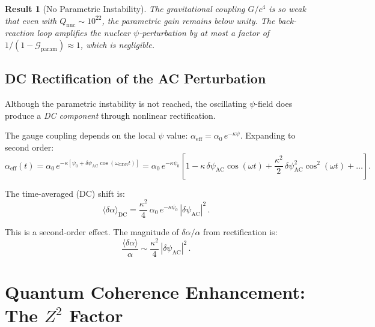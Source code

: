 \documentclass[aps,prd,twocolumn,superscriptaddress,nofootinbib]{revtex4-2}
\newcommand{\kap}{\kappa}
\newcommand{\aeff}{\alpha_{\mathrm{eff}}}
\newcommand{\dalpha}{\delta\alpha}
\newcommand{\Qnuc}{Q_{\mathrm{nuc}}}
\newcommand{\wGDR}{\omega_{\mathrm{GDR}}}
\newtheorem{result}{Result}
\begin{document}
\begin{result}[No Parametric Instability]
The gravitational coupling $G/c^4$ is so weak that even with
$\Qnuc \sim 10^{22}$, the parametric gain remains below unity.
The back-reaction loop amplifies the nuclear $\psi$-perturbation
by at most a factor of $1/(1 - \mathcal{G}_{\mathrm{param}}) \approx
1$, which is negligible.
\end{result}

\subsection{DC Rectification of the AC Perturbation}
\label{sec:rectification}

Although the parametric instability is not reached, the oscillating
$\psi$-field does produce a \emph{DC component} through nonlinear
rectification.

The gauge coupling depends on the local $\psi$ value:
$\aeff = \alpha_0\,e^{-\kap\psi}$.  Expanding to second order:
\begin{equation}
\aeff(t) = \alpha_0\,e^{-\kap[\psi_0 + \delta\psi_{\mathrm{AC}}
\cos(\wGDR t)]}
= \alpha_0\,e^{-\kap\psi_0}\left[1 - \kap\,\delta\psi_{\mathrm{AC}}
\cos(\omega t) + \frac{\kap^2}{2}\,\delta\psi_{\mathrm{AC}}^2
\cos^2(\omega t) + \ldots\right].
\end{equation}

The time-averaged (DC) shift is:
\begin{equation}\label{eq:dc-rectified}
\langle\dalpha\rangle_{\mathrm{DC}} = \frac{\kap^2}{4}\,\alpha_0\,
e^{-\kap\psi_0}\,|\delta\psi_{\mathrm{AC}}|^2\,.
\end{equation}

This is a second-order effect.  The magnitude of $\dalpha/\alpha$
from rectification is:
\begin{equation}\label{eq:da-rectified}
\frac{\langle\dalpha\rangle}{\alpha} \sim
\frac{\kap^2}{4}\,|\delta\psi_{\mathrm{AC}}|^2\,.
\end{equation}


\section{Quantum Coherence Enhancement: The $Z^2$ Factor}
\label{sec:coherence}
\end{document}
